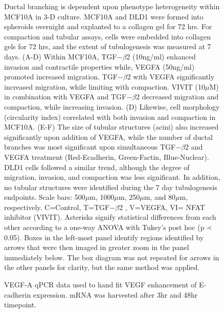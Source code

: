 \documentclass[11pt,letterpaper]{article}
\begin{document}
\begin{figure}
\caption{Ductal branching is dependent upon phenotype heterogeneity within MCF10A in 3-D culture.  MCF10A and DLD1 were formed into spheroids overnight and explanted to a collagen gel for 72 hrs.  For compaction and tubular assays, cells were embedded into collagen gels for 72 hrs, and the extent of tubulogenesis was measured at 7 days.  (A-D) Within MCF10A, TGF$-\beta$2 (10ng/ml) enhanced invasion and contractile properties while, VEGFA (50ng/ml) promoted increased migration.  TGF$-\beta$2 with VEGFA significantly increased migration, while limiting with compaction.  VIVIT (10$\mu$M) in combination with VEGFA and TGF$-\beta$2 decreased migration and compaction, while increasing invasion.  (D) Likewise, cell morphology (circularity index) correlated with both invasion and compaction in MCF10A.  (E-F) The size of tubular structures (acini) also increased significantly upon addition of VEGFA, while the number of ductal branches was most significant upon simultaneous TGF$-\beta$2 and VEGFA treatment (Red-Ecadherin, Green-Factin, Blue-Nuclear).   DLD1 cells followed a similar trend, although the degree of migration, invasion, and compaction was less significant.  In addition, no tubular structures were identified during the 7 day tubulogenesis endpoints.  Scale bars: 500$\mu$m, 1000$\mu$m, 250$\mu$m, and 80$\mu$m, respectively.  C=Control, T=TGF$-\beta$2 , V=VEGFA, VI= NFAT inhibitor (VIVIT).  Asterisks signify statistical differences from each other according to a one-way ANOVA with Tukey's post hoc (p$\prec$0.05).
Boxes in the left-most panel identify regions identified by arrows that were then imaged in greater zoom in the panel immediately below.
The box diagram was not repeated for arrows in the other panels for clarity, but the same method was applied.}\label{fg:F6}
\end{figure}

\clearpage

\renewcommand\thefigure{S\arabic{figure}}
\renewcommand\thetable{T\arabic{table}}
\renewcommand\thepage{S-\arabic{page}}
\renewcommand\theequation{S\arabic{equation}}

\setcounter{equation}{0}
\setcounter{table}{0}
\setcounter{figure}{0}
\setcounter{page}{1}

\clearpage

\begin{figure}
  \caption{VEGF-A qPCR data used to hand fit VEGF enhancement of E-cadherin expression. mRNA was harvested after 3hr and 48hr timepoint.}\label{fg:VEGFA-Data}
\end{figure}
\end{document}
